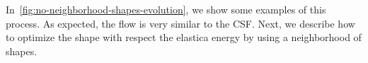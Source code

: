 \documentclass[review]{siamart220329}
\begin{document}
In~\cref{fig:no-neighborhood-shapes-evolution}, we show some examples of this process. As expected, the flow is very similar to the CSF. Next, we describe how to optimize the shape with respect the elastica energy by using a neighborhood of shapes.
%
%
%
\begin{figure}
	\center
	\hspace{2em}%
	\hspace{2em}%

\end{figure}
\end{document}
